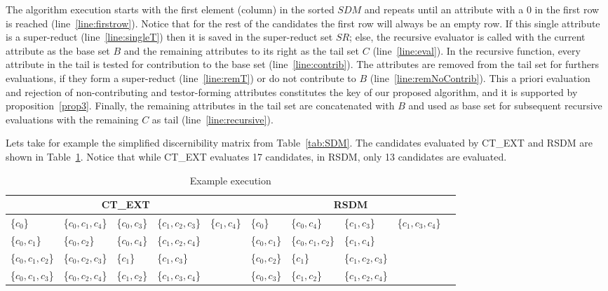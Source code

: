 \documentclass[authoryear,11pt]{elsarticle}
\begin{document}
	
	The algorithm execution starts with the first element (column) in the sorted $SDM$ and repeats until an 
	attribute with a 0 in the first row is reached (line~\ref{line:firstrow}). Notice that for the rest of the
	candidates the first row will always be an empty row. If this single attribute is a super-reduct
	(line~\ref{line:singleT}) then it is saved in the super-reduct set $SR$; else, the recursive evaluator 
	is called with the current attribute as the base set $B$ and the remaining attributes to its right as the 
	tail set $C$ (line~\ref{line:eval}).
	In the recursive function, every attribute in the tail is tested for contribution to the base set 
	(line~\ref{line:contrib}). The attributes are removed from the tail set for furthers evaluations, if they 
	form a super-reduct (line~\ref{line:remT}) or do not contribute to $B$ (line~\ref{line:remNoContrib}).
	This a priori evaluation and rejection of non-contributing and testor-forming attributes constitutes the key
	of our proposed algorithm, and it is supported by proposition~\ref{prop3}.
	Finally, the remaining attributes in the tail set are concatenated with $B$ and used as base set for
	subsequent recursive evaluations with the remaining $C$ as tail (line~\ref{line:recursive}).
		
	Lets take for example the simplified discernibility matrix from Table~\ref{tab:SDM}. The candidates evaluated 
	by CT\_EXT and RSDM  are shown in Table~\ref{tab:run}. Notice that while CT\_EXT evaluates 17 candidates,
	in RSDM, only 13 candidates are evaluated. 
	
	\begin{table}[!htb]\small
		\setlength{\tabcolsep}{.1em}
		\caption{Example execution}\label{tab:run}
      	\centering
    		\begin{tabular}{|lllll|lllll|}
    		\hline
    		\multicolumn{5}{|c|}{CT\_EXT} & \multicolumn{5}{c|}{RSDM}\\
    		\hline
    		\{$ c_0$\} 	 		& \{$c_0,c_1,c_4$\}	& \{$c_0,c_3$\}		& \{$c_1,c_2,c_3$\}	& \{$c_1,c_4$\}	
    		& \{$c_0$\}			& \{$c_0,c_4$\} 		& \{$c_1,c_3$\} 		& \{$c_1,c_3,c_4$\}	&\\
    		\{$c_0,c_1$\} 		& \{$c_0,c_2$\}  	& \{$c_0,c_4$\}		& \{$c_1,c_2,c_4$\}	& 
    		& \{$c_0,c_1$\}		& \{$c_0,c_1,c_2$\} 	& \{$c_1,c_4$\}		&&\\
    		\{$c_0,c_1,c_2$\}	& \{$c_0,c_2,c_3$\}	& \{$c_1$\}			& \{$c_1,c_3$\}	  	&			
    		& \{$c_0,c_2$\} 		& \{$c_1$\}		 	& \{$c_1,c_2,c_3$\}	&&\\
    		\{$c_0,c_1,c_3$\} 	& \{$c_0,c_2,c_4$\}	& \{$c_1,c_2$\} 		& \{$c_1,c_3,c_4$\}	&			
    		& \{$c_0,c_3$\} 		& \{$c_1,c_2$\}	 	& \{$c_1,c_2,c_4$\}	&&\\
    		\hline
		\end{tabular}
	\end{table}
\end{document}
